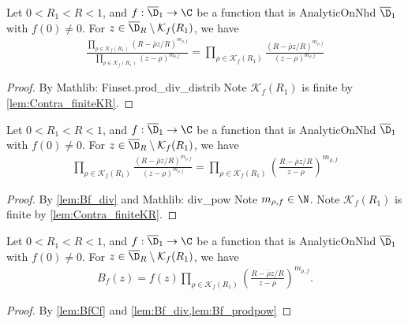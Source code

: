 \begin{lemma}[B division]\label{lem:Bf_div}  \leanok
Let $0<R_1<R<1$, and $f:\overline{\D}_1\to\C$ be a function that is AnalyticOnNhd $\overline{\D}_1$ with $f(0)\neq0$. For $z\in \overline{\D}_R\setminus\mathcal K_f(R_1)$, we have
\begin{align*}
\frac{\prod_{\rho\in \mathcal K_f(R_1)} (R-\bar\rho z/R)^{m_{\rho,f}}}{\prod_{\rho\in \mathcal K_f(R_1)} (z-\rho)^{m_{\rho,f}}} = \prod_{\rho\in \mathcal K_f(R_1)}\frac{ (R-\bar\rho z/R)^{m_{\rho,f}}}{(z-\rho)^{m_{\rho,f}}}
\end{align*}
\end{lemma}
\begin{proof}
\leanok
By Mathlib: Finset.prod\_div\_distrib
Note $\mathcal K_f(R_1)$ is finite by \cref{lem:Contra_finiteKR}.
\end{proof}

\begin{lemma}\label{lem:Bf_prodpow}  \leanok
Let $0<R_1<R<1$, and $f:\overline{\D}_1\to\C$ be a function that is AnalyticOnNhd $\overline{\D}_1$ with $f(0)\neq0$. For $z\in \overline{\D}_R\setminus\mathcal K_f(R_1)$, we have
\begin{align*}
\prod_{\rho\in \mathcal K_f(R_1)}\frac{ (R-\bar\rho z/R)^{m_{\rho,f}}}{(z-\rho)^{m_{\rho,f}}}=
\prod_{\rho\in \mathcal K_f(R_1)} \left(\frac{R-\bar\rho z/R}{z-\rho} \right)^{m_{\rho,f}}
\end{align*}
\end{lemma}
\begin{proof}
\leanok
By \cref{lem:Bf_div} and Mathlib: div\_pow
Note $m_{\rho,f}\in\N$.
Note $\mathcal K_f(R_1)$ is finite by \cref{lem:Contra_finiteKR}.
\end{proof}

\begin{lemma}[B off K]\label{lem:Bf_off_K}  \leanok
Let $0<R_1<R<1$, and $f:\overline{\D}_1\to\C$ be a function that is AnalyticOnNhd $\overline{\D}_1$ with $f(0)\neq0$. For $z\in \overline{\D}_R\setminus\mathcal K_f(R_1)$, we have
\begin{align*}
B_f(z)= f(z)\prod_{\rho\in \mathcal K_f(R_1)} \left(\frac{R-\bar\rho z/R}{z-\rho} \right)^{m_{\rho,f}}.
\end{align*}
\end{lemma}
\begin{proof}
\leanok
By \cref{lem:BfCf} and \cref{lem:Bf_div,lem:Bf_prodpow}
\end{proof}


